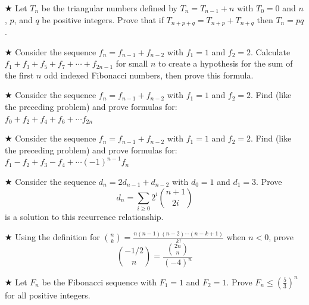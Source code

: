 \begin{proofp}$\bigstar$
Let $T_n$ be the triangular numbers defined by $T_n=T_{n-1}+n$ with $T_0=0$ and $n$, $p$, and $q$ be positive integers.  Prove that if $T_{n+p+q}=T_{n+p}+T_{n+q}$ then  $T_n=pq$.
\end{proofp}


\begin{proofp}$\bigstar$
Consider the sequence $f_n=f_{n-1}+f_{n-2}$ with $f_1=1$ and $f_2=2$. Calculate $f_1+f_3+f_5+f_7 +\cdots +f_{2n-1}$ for small $n$ to create a hypothesis for the sum of the first $n$ odd indexed Fibonacci numbers, then prove this formula.
\end{proofp}

\begin{proofp}$\bigstar$
Consider the sequence $f_n=f_{n-1}+f_{n-2}$ with $f_1=1$ and $f_2=2$.  Find (like the preceding problem) and prove formulas for:\\
$f_0+f_2+f_4+f_6 +\cdots f_{2n}$\\
\end{proofp}

\begin{proofp}$\bigstar$
Consider the sequence $f_n=f_{n-1}+f_{n-2}$ with $f_1=1$ and $f_2=2$.  Find (like the preceding problem) and prove formulas for:\\
$f_1-f_2+f_3-f_4 +\cdots (-1)^{n-1}f_{n}$
\end{proofp}


\begin{proofp}$\bigstar$
Consider the sequence $d_n=2d_{n-1}+d_{n-2}$ with $d_0=1$ and $d_1=3$.  Prove $$d_n=\sum_{i\ge0}^{}2^i\binom{n+1}{2i}$$ is a solution to this recurrence relationship.
\end{proofp}

\begin{proofp}$\bigstar$
Using the definition for $\binom{n}{k} =\frac{n(n-1)(n-2) \cdots (n-k+1)}{k!}$ when $n<0$, prove $$\binom{-1/2}{n}=\frac{\binom{2n}{n}}{(-4)^n}$$
\end{proofp}

\begin{proofp}$\bigstar$
Let $F_n$ be the Fibonacci sequence with $F_1=1$ and $F_2=1$.  Prove $F_n \leq (\frac{5}{3})^n$ for all positive integers.
\end{proofp}

